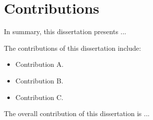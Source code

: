 \section{Contributions}

In summary, this dissertation presents ...

The contributions of this dissertation include: 

\begin{itemize}
    \item Contribution A.
    \item Contribution B.
    \item Contribution C.
\end{itemize}

The overall contribution of this dissertation is ...